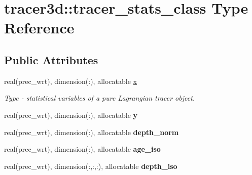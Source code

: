 \hypertarget{structtracer3d_1_1tracer__stats__class}{}\section{tracer3d\+:\+:tracer\+\_\+stats\+\_\+class Type Reference}
\label{structtracer3d_1_1tracer__stats__class}
\subsection*{Public Attributes}
\begin{DoxyCompactItemize}
\item 
\mbox{\label{structtracer3d_1_1tracer__stats__class_a750469bccc9315fe015620cfc0372dfe}} 
real(prec\+\_\+wrt), dimension(\+:), allocatable \mbox{\hyperlink{structtracer3d_1_1tracer__stats__class_a750469bccc9315fe015620cfc0372dfe}{x}}
\begin{DoxyCompactList}\small\item\em Type -\/ statistical variables of a pure Lagrangian tracer object. \end{DoxyCompactList}\item 
\mbox{\label{structtracer3d_1_1tracer__stats__class_ae94ba5c4f5b52177aa5a41ce6a148614}} 
real(prec\+\_\+wrt), dimension(\+:), allocatable {\bfseries y}
\item 
\mbox{\label{structtracer3d_1_1tracer__stats__class_a4899ddcdd6e2400c6b57307cb0639dbd}} 
real(prec\+\_\+wrt), dimension(\+:), allocatable {\bfseries depth\+\_\+norm}
\item 
\mbox{\label{structtracer3d_1_1tracer__stats__class_a49b6cc3608dc340fe6be374b3a2373c0}} 
real(prec\+\_\+wrt), dimension(\+:), allocatable {\bfseries age\+\_\+iso}
\item 
\mbox{\label{structtracer3d_1_1tracer__stats__class_aabccc48aabf79b2432bfcc2afcd95e39}} 
real(prec\+\_\+wrt), dimension(\+:,\+:,\+:), allocatable {\bfseries depth\+\_\+iso}
\item 
\mbox{\label{structtracer3d_1_1tracer__stats__class_a5871290f233762da617a4624778110cd}} 

\end{DoxyCompactItemize}
